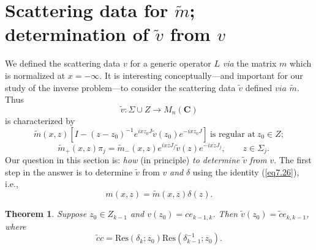 \documentclass{surv-l}
\theoremstyle{plain}
\newtheorem{theorem}{Theorem}[section]
\theoremstyle{definition}
\numberwithin{equation}{chapter}
\begin{document}
\section{Scattering data for $\tilde{m}$; determination of $\tilde{v}$ from $v$}\label{sec14}
We defined the scattering data $v$ for a generic operator $L$ \emph{via} the matrix $m$ which is normalized at $ x=-\infty$. It is interesting conceptually---and important for our study of the inverse problem---to consider the scattering data $\tilde{v}$ defined $via$ $\tilde{m}$. Thus
\setcounter{equation}{0}
\begin{equation*}
\tilde{v}:\Sigma\cup Z\rightarrow M_{n}(\mathbf{C})
\end{equation*}
is characterized by
\begin{equation}\label{eq14.1}
\tilde{m}(x, z)[I-(z-z_{0})^{-1}e^{ixz_{0}J}\tilde{v}(z_{0})e^{-ixz_{0}J}]\ \text{is regular at}\ z_{0}\in Z;
\end{equation}
\begin{equation}\label{eq14.2}
\quad \tilde{m}_{+}(x, z)\pi_{j}=\tilde{m}_{-}(x, z)e^{ixzJ_{j}}\tilde{v}(z)e^{-ixzJ_{j}},\qquad z\in\Sigma_{j}.
\end{equation}
Our question in this section is: \emph{how} (in principle) \emph{to determine} $\tilde{v}$ \emph{from} $v$. The first step in the answer is to determine $\tilde{v}$ from $v$ \emph{and} $\delta$ using the identity (\ref{eq7.26}), i.e.,
\begin{equation}\label{eq14.3}
m(x, z)=\tilde{m}(x, z)\delta(z).
\end{equation}
\setcounter{theorem}{3}
\begin{theorem}\label{thm14.4}
Suppose $z_{0}\in Z_{k-1}$ and $v(z_{0})=ce_{k-1,k}$. Then $\tilde{v}(z_{0})= \tilde{c}e_{k,k-1}$, where
\setcounter{equation}{4}
\begin{equation}\label{eq14.5}
\tilde{c}c=\mathrm{Res}(\delta_{k};z_{0})\mathrm{Res}(\delta_{k-1}^{-1}; z_{0}).
\end{equation}
\end{theorem}
\end{document}
